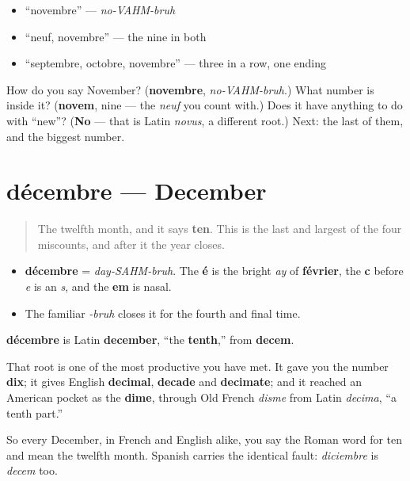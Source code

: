 \begin{itemize}
\raggedright
  \item \textquotedblleft{}novembre\textquotedblright{} — \emph{no-VAHM-bruh}
  \item \textquotedblleft{}neuf, novembre\textquotedblright{} — the nine in both
  \item \textquotedblleft{}septembre, octobre, novembre\textquotedblright{} — three in a row, one ending
\end{itemize}

\begin{tcolorbox}[breakable,colback=teal!4,colframe=teal!35!black,title={Before you move on}]
How do you say November? (\textbf{novembre}, \emph{no-VAHM-bruh}.) What number is inside it? (\textbf{novem}, nine — the \emph{neuf} you count with.) Does it have anything to do with \textquotedblleft{}new\textquotedblright{}? (\textbf{No} — that is Latin \emph{novus}, a different root.) Next: the last of them, and the biggest number.
\end{tcolorbox}
\section[décembre]{décembre — December}

\label{lesson:FR-C09-decembre}



\begin{quote}
The twelfth month, and it says \textbf{ten}. This is the last and largest of the four miscounts, and after it the year closes.
\end{quote}

\begin{sounds}
\begin{itemize}
\raggedright
  \item \textbf{décembre} = \emph{day-SAHM-bruh}. The \textbf{é} is the bright \emph{ay} of \textbf{février}, the \textbf{c} before \emph{e} is an \emph{s}, and the \textbf{em} is nasal.
  \item The familiar \emph{-bruh} closes it for the fourth and final time.
\end{itemize}
\end{sounds}

\begin{cousinweb}
\textbf{décembre} is Latin \textbf{december}, \textquotedblleft{}the \textbf{tenth},\textquotedblright{} from \textbf{decem}.

That root is one of the most productive you have met. It gave you the number \textbf{dix}; it gives English \textbf{decimal}, \textbf{decade} and \textbf{decimate}; and it reached an American pocket as the \textbf{dime}, through Old French \emph{disme} from Latin \emph{decima}, \textquotedblleft{}a tenth part.\textquotedblright{}

So every December, in French and English alike, you say the Roman word for ten and mean the twelfth month. Spanish carries the identical fault: \emph{diciembre} is \emph{decem} too.
\end{cousinweb}

